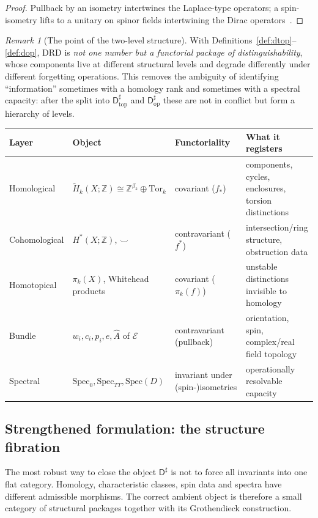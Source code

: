 \documentclass[11pt,a4paper]{article}
\theoremstyle{definition}
\theoremstyle{remark}
\newtheorem{remark}[theorem]{Remark}
\newcommand{\Z}{\mathbb{Z}}
\newcommand{\rH}{\widetilde H}
\newcommand{\Dsharp}{\mathsf{D}^{\sharp}}
\newcommand{\Dtop}{\mathsf{D}^{\sharp}_{\mathrm{top}}}
\newcommand{\Dop}{\mathsf{D}^{\sharp}_{\mathrm{op}}}
\begin{document}
\begin{proof}
Pullback by an isometry intertwines the Laplace-type operators; a spin-isometry lifts to a
unitary on spinor fields intertwining the Dirac operators~\cite{Baer1996}.
\end{proof}

\begin{remark}[The point of the two-level structure]
With Definitions~\ref{def:dtop}--\ref{def:dop}, DRD is \emph{not one number but a functorial
package of distinguishability}, whose components live at different structural levels and
degrade differently under different forgetting operations.  This removes the ambiguity of
identifying ``information'' sometimes with a homology rank and sometimes with a spectral
capacity: after the split into $\Dtop$ and $\Dop$ these are not in conflict but form a
hierarchy of levels.
\end{remark}

\begin{center}
\small
\begin{tabularx}{\textwidth}{@{}lYYY@{}}
\toprule
\textbf{Layer} & \textbf{Object} & \textbf{Functoriality} & \textbf{What it registers}\\
\midrule
Homological & $\rH_{k}(X;\Z)\cong\Z^{\beta_k}\!\oplus\mathrm{Tor}_k$ & covariant ($f_{\ast}$) &
components, cycles, enclosures, torsion distinctions\\
Cohomological & $H^{\ast}(X;\Z)$, $\smile$ & contravariant ($f^{\ast}$) &
intersection/ring structure, obstruction data\\
Homotopical & $\pi_{k}(X)$, Whitehead products & covariant ($\pi_{k}(f)$) &
unstable distinctions invisible to homology\\
Bundle & $w_{i},c_{i},p_{i},e,\hat A$ of $\mathcal E$ & contravariant (pullback) &
orientation, spin, complex/real field topology\\
Spectral & $\mathrm{Spec}_{0},\mathrm{Spec}_{TT},\mathrm{Spec}(D)$ &
invariant under (spin-)isometries & operationally resolvable capacity\\
\bottomrule
\end{tabularx}
\end{center}

\subsection{Strengthened formulation: the structure fibration}
\label{subsec:structure-fibration}

The most robust way to close the object $\Dsharp$ is not to force all invariants into one
flat category.  Homology, characteristic classes, spin data and spectra have different
admissible morphisms.  The correct ambient object is therefore a small category of structural
packages together with its Grothendieck construction.
\end{document}

